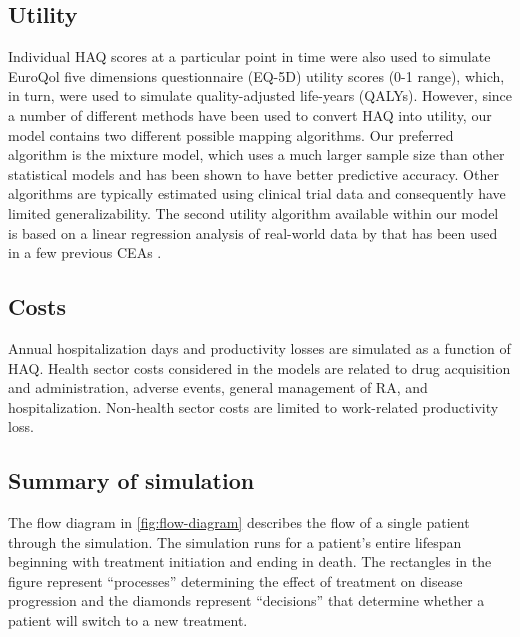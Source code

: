 \documentclass[11pt,final,fleqn]{article}\usepackage[]{graphicx}\usepackage[]{color}
\theoremstyle{plain}
\begin{document}
\subsection{Utility}
Individual HAQ scores at a particular point in time were also used to simulate EuroQol five dimensions questionnaire (EQ-5D) utility scores (0-1 range), which, in turn, were used to simulate quality-adjusted life-years (QALYs). However, since a number of different methods have been used to convert HAQ into utility, our model contains two different possible mapping algorithms. Our preferred algorithm is the \citet{alava2013relationship} mixture model, which uses a much larger sample size than other statistical models and has been shown to have better predictive accuracy. Other algorithms are typically estimated using clinical trial data \citep[e.g.][]{carlson2015economic, stephens2015modelling} and consequently have limited generalizability. The second utility algorithm available within our model is based on a linear regression analysis of real-world data by \citet{wailoo2006modeling} that has been used in a few previous CEAs \citep[e.g.][]{wailoo2008biologic, icer2017tim}. 

\subsection{Costs}
Annual hospitalization days and productivity losses are simulated as a function of HAQ. Health sector costs considered in the models are related to drug acquisition and administration, adverse events, general management of RA, and hospitalization. Non-health sector costs are limited to work-related productivity loss.

\subsection{Summary of simulation}
The flow diagram in \autoref{fig:flow-diagram} describes the flow of a single patient through the simulation. The simulation runs for a patient's entire lifespan beginning with treatment initiation and ending in death. The rectangles in the figure represent ``processes'' determining the effect of treatment on disease progression and the diamonds represent ``decisions'' that determine whether a patient will switch to a new treatment.
\end{document}
